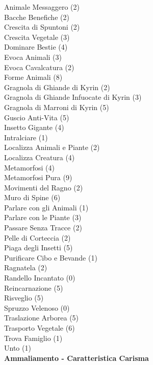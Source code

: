 \begin{multicols}{3}
{	
	Animale Messaggero (2)\\
	Bacche Benefiche (2)\\
	Crescita di Spuntoni (2)\\
	Crescita Vegetale (3)\\
	Dominare Bestie (4)\\
	Evoca Animali (3)\\
	Evoca Cavalcatura (2)\\
	Forme Animali (8)\\
	Gragnola di Ghiande di Kyrin (2)\\
	Gragnola di Ghiande Infuocate di Kyrin (3)\\
	Gragnola di Marroni di Kyrin (5)\\
	Guscio Anti-Vita (5)\\
	Insetto Gigante (4)\\
	Intralciare (1)\\
	Localizza Animali e Piante (2)\\
	Localizza Creatura (4)\\
	Metamorfosi (4)\\
	Metamorfosi Pura (9)\\
	Movimenti del Ragno (2)\\
	Muro di Spine (6)\\
	Parlare con gli Animali (1)\\
	Parlare con le Piante (3)\\
	Passare Senza Tracce (2)\\
	Pelle di Corteccia (2)\\
	Piaga degli Insetti (5)\\
	Purificare Cibo e Bevande (1)\\
	Ragnatela (2)\\
	Randello Incantato (0)\\
	Reincarnazione (5)\\
	Risveglio (5)\\
	Spruzzo Velenoso (0)\\
	Traslazione Arborea (5)\\
	Trasporto Vegetale (6)\\
	Trova Famiglio (1)\\
	Unto (1)\\

	\medskip\textbf{Ammaliamento - Caratteristica Carisma}

}
\end{multicols}
